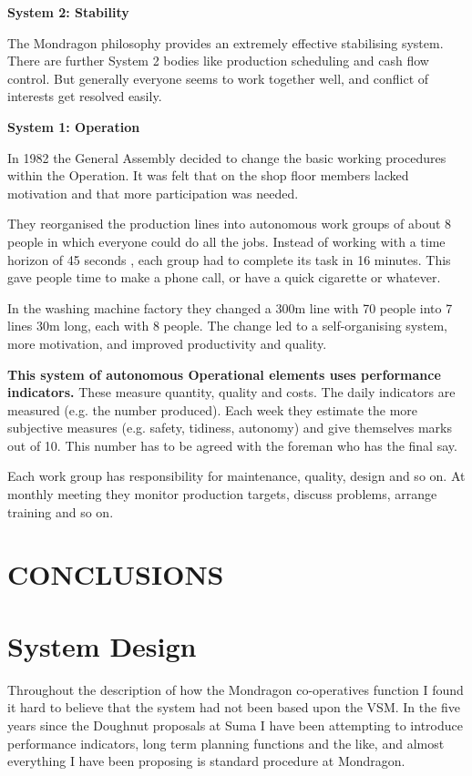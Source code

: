 \textbf{System 2: Stability}

The Mondragon philosophy provides an extremely effective stabilising system. There are further System 2 bodies like production scheduling and cash flow control. But generally everyone seems to work together well, and conflict of interests get resolved easily.

\textbf{System 1: Operation}

In 1982 the General Assembly decided to change the basic working procedures within the Operation. It was felt that on the shop floor members lacked motivation and that more participation was needed.

They reorganised the production lines into autonomous work groups of about 8 people in which everyone could do all the jobs. Instead of working with a time horizon of 45 seconds , each group had to complete its task in 16 minutes. This gave people time to make a phone call, or have a quick cigarette or whatever.

In the washing machine factory they changed a 300m line with 70 people into 7 lines 30m long, each with 8 people. The change led to a self-organising system, more motivation, and improved productivity and quality.

\textbf{This system of autonomous Operational elements uses performance indicators.} These measure quantity, quality and costs. The daily indicators are measured (e.g. the number produced). Each week they estimate the more subjective measures (e.g. safety, tidiness, autonomy) and give themselves marks out of 10. This number has to be agreed with the foreman who has the final say.

Each work group has responsibility for maintenance, quality, design and so on. At monthly meeting they monitor production targets, discuss problems, arrange training and so on.

\section*{CONCLUSIONS}

\section*{System Design}
Throughout the description of how the Mondragon co-operatives function I found it hard to believe that the system had not been based upon the VSM. In the five years since the Doughnut proposals at Suma I have been attempting to introduce performance indicators, long term planning functions and the like, and almost everything I have been proposing is standard procedure at Mondragon.

